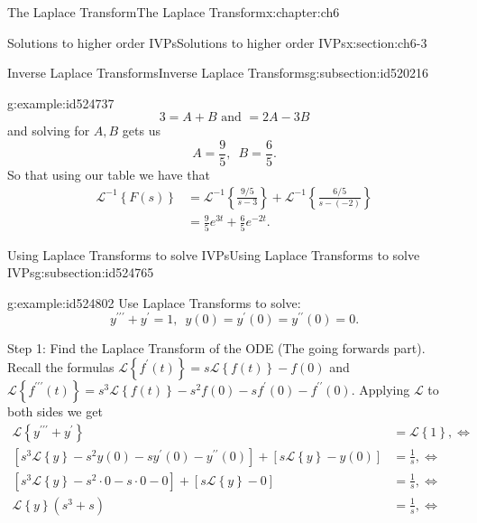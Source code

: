 \documentclass[oneside,10pt,]{book}
\numberwithin{equation}{section}
\numberwithin{equation}{section}
\newcommand{\amp}{&}
\begin{document}
\begin{chapterptx}{The Laplace Transform}{}{The Laplace Transform}{}{}{x:chapter:ch6}
\begin{sectionptx}{Solutions to higher order IVPs}{}{Solutions to higher order IVPs}{}{}{x:section:ch6-3}
\begin{subsectionptx}{Inverse Laplace Transforms}{}{Inverse Laplace Transforms}{}{}{g:subsection:id520216}
\begin{example}{}{g:example:id524737}
\begin{equation*}
3=A+B\text{ and }=2A-3B
\end{equation*}
and solving for \(A,B\) gets us%
\begin{equation*}
A=\frac{9}{5},\,\,\,B=\frac{6}{5}.
\end{equation*}
So that using our table we have that%
\begin{align*}
\mathcal{L}^{-1}\left\{ F(s)\right\}  \amp =\mathcal{L}^{-1}\left\{ \frac{9/5}{s-3}\right\} +\mathcal{L}^{-1}\left\{ \frac{6/5}{s-(-2)}\right\} \\
\amp =\frac{9}{5}e^{3t}+\frac{6}{5}e^{-2t}.
\end{align*}
%
\end{example}
\end{subsectionptx}
%
%
\typeout{************************************************}
\typeout{************************************************}
%
\begin{subsectionptx}{Using Laplace Transforms to solve IVPs}{}{Using Laplace Transforms to solve IVPs}{}{}{g:subsection:id524765}
\begin{example}{}{g:example:id524802}%
Use Laplace Transforms to solve:%
\begin{equation*}
y^{\prime\prime\prime}+y^{\prime}=1,\,\,\,y(0)=y^{\prime}(0)=y^{\prime\prime}(0)=0.
\end{equation*}
%
\par
Step 1: Find the Laplace Transform of the ODE (The going forwards part). Recall the formulas \(\mathcal{L}\left\{ f^{\prime}(t)\right\} =s\mathcal{L}\left\{ f(t)\right\} -f(0)\) and \(\mathcal{L}\left\{ f^{\prime\prime\prime}(t)\right\} =s^{3}\mathcal{L}\left\{ f(t)\right\} -s^{2}f(0)-sf^{\prime}(0)-f^{\prime\prime}(0)\). Applying \(\mathcal{L}\) to both sides we get%
\begin{align*}
\mathcal{L}\left\{ y^{\prime\prime\prime}+y^{\prime}\right\}  \amp =\mathcal{L}\left\{ 1\right\} ,\iff\\
\left[s^{3}\mathcal{L}\left\{ y\right\} -s^{2}y(0)-sy^{\prime}(0)-y^{\prime\prime}(0)\right]+\left[s\mathcal{L}\left\{ y\right\} -y(0)\right] \amp =\frac{1}{s},\iff\\
\left[s^{3}\mathcal{L}\left\{ y\right\} -s^{2}\cdot0-s\cdot0-0\right]+\left[s\mathcal{L}\left\{ y\right\} -0\right] \amp =\frac{1}{s},\iff\\
\mathcal{L}\left\{ y\right\} \left(s^{3}+s\right) \amp =\frac{1}{s},\iff
\end{align*}
%
\par

\end{example}
\end{subsectionptx}
\end{sectionptx}
\end{chapterptx}
\end{document}
